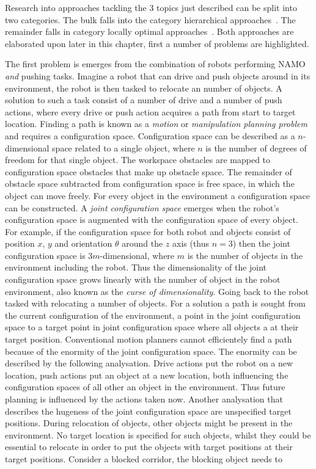 Research into approaches tackling the 3 topics just described can be split into two categories. The bulk falls into the category hierarchical approaches~\cite{kaelbling_hierarchical_2011,scholz_navigation_2016,krontiris_dealing_2015}. The remainder falls in category locally optimal approaches~\cite{vega-brown_asymptotically_2020,sabbaghnovin_optimal_2016,novin_dynamic_2018,sabbaghnovin_model_2021}. Both approaches are elaborated upon later in this chapter, first a number of problems are highlighted.\bs

The first problem is emerges from the combination of robots performing \ac{NAMO} \textit{and} pushing tasks. Imagine a robot that can drive and push objects around in its environment, the robot is then tasked to relocate an number of objects. A solution to such a task consist of a number of drive and a number of push actions, where every drive or push action acquires a path from start to target location. Finding a path  is known as a \textit{motion} or \textit{manipulation planning problem} and requires a configuration space. Configuration space can be described as a $n$-dimensional space related to a single object, where $n$ is the number of degrees of freedom for that single object. The workspace obstacles are mapped to configuration space obstacles that make up obstacle space. The remainder of obstacle space subtracted from configuration space is free space, in which the object can move freely. For every object in the environment a configuration space can be constructed. A \textit{joint configuration space} emerges when the robot's configuration space is augmented with the configuration space of every object. For example, if the configuration space for both robot and objects consist of position $x$, $y$ and orientation $\theta$ around the $z$ axis (thus $n=3$) then the joint configuration space is $3m$-dimensional, where $m$ is the number of objects in the environment including the robot. Thus the dimensionality of the joint configuration space grows linearly with the number of object in the robot environment, also known as the \textit{curse of dimensionality}. Going back to the robot tasked with relocating a number of objects. For a solution a path is sought from the current configuration of the environment, a point in the joint configuration space to a target point in joint configuration space where all objects a at their target position. Conventional motion planners cannot efficientely find a path because of the enormity of the joint configuration space. The enormity can be described by the following analysation. Drive actions put the robot on a new location, push actions put an object at a new location, both influencing the configuration spaces of all other an object in the environment. Thus future planning is influenced by the actions taken now. Another analysation that describes the hugeness of the joint configuration space are unspecified target positions. During relocation of objects, other objects might be present in the environment. No target location is specified for such objects, whilst they could be essential to relocate in order to put the objects with target positions at their target positions. Consider a blocked corridor, the blocking object needs to 